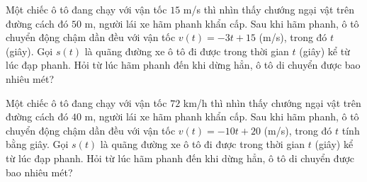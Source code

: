\begin{ex}%
Một chiếc ô tô đang chạy với vận tốc $15$ m/s thì nhìn thấy chướng ngại vật trên đường cách đó $50$ m, người lái xe hãm phanh khẩn cấp. Sau khi hãm phanh, ô tô chuyển động chậm dần đều với vận tốc $v(t)=-3t+15$ (m/s), trong đó $t$ (giây). Gọi $s(t)$ là quãng đường xe ô tô đi được trong thời gian $t$ (giây) kể từ lúc đạp phanh. Hỏi từ lúc hãm phanh đến khi dừng hẳn, ô tô di chuyển được bao nhiêu mét?
\end{ex}

\begin{ex}%
Một chiếc ô tô đang chạy với vận tốc $72$ km/h thì nhìn thấy chướng ngại vật trên đường cách đó $40$ m, người lái xe hãm phanh khẩn cấp. Sau khi hãm phanh, ô tô chuyển động chậm dần đều với vận tốc $v(t)=-10t+20$ (m/s), trong đó $t$ tính bằng giây. Gọi $s(t)$ là quãng đường xe ô tô đi được trong thời gian $t$ (giây) kể từ lúc đạp phanh.
Hỏi từ lúc hãm phanh đến khi dừng hẳn, ô tô di chuyển được bao nhiêu mét?
\end{ex}

